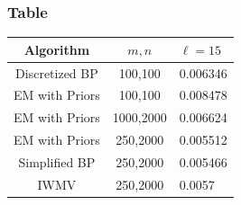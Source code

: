\documentclass[10pt, compress, onlymath]{beamer}
\begin{document}
\begin{frame}[fragile]
  \frametitle{Table}

\begin{table}[htdp]

\begin{center}
\begin{tabular}{|c|c|l|}
\hline
Algorithm & $m,n$ & $\ell = 15$ \\
\hline
Discretized BP & 100,100 & 0.006346 \\
EM with Priors & 100,100 & 0.008478 \\
EM with Priors & 1000,2000 & 0.006624 \\
EM with Priors & 250,2000 & 0.005512 \\
Simplified BP & 250,2000 & 0.005466 \\
IWMV & 250,2000 & 0.0057\\
\hline
\end{tabular}
\end{center}
\label{default}
\end{table}%



\end{frame}


\end{document}
